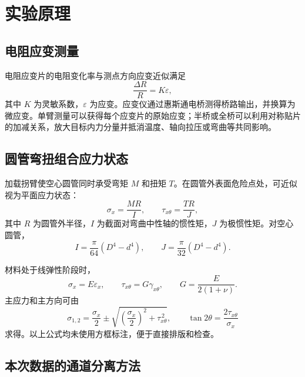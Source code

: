 \documentclass[UTF8,a4paper,10pt]{ctexart}
\begin{document}
\section{实验原理}

\subsection{电阻应变测量}

电阻应变片的电阻变化率与测点方向应变近似满足
\begin{equation}
    \frac{\Delta R}{R}=K\varepsilon ,
\end{equation}
其中 $K$ 为灵敏系数，$\varepsilon$ 为应变。应变仪通过惠斯通电桥测得桥路输出，并换算为微应变。单臂测量可以获得每个应变片的原始应变；半桥或全桥可以利用对称贴片的加减关系，放大目标内力分量并抵消温度、轴向拉压或弯曲等共同影响。

\subsection{圆管弯扭组合应力状态}

加载拐臂使空心圆管同时承受弯矩 $M$ 和扭矩 $T$。在圆管外表面危险点处，可近似视为平面应力状态：
\begin{equation}
    \sigma_x=\frac{MR}{I}, \qquad
    \tau_{x\theta}=\frac{TR}{J},
\end{equation}
其中 $R$ 为圆管外半径，$I$ 为截面对弯曲中性轴的惯性矩，$J$ 为极惯性矩。对空心圆管，
\begin{equation}
    I=\frac{\pi}{64}\left(D^4-d^4\right), \qquad
    J=\frac{\pi}{32}\left(D^4-d^4\right).
\end{equation}

材料处于线弹性阶段时，
\begin{equation}
    \sigma_x=E\varepsilon_x,\qquad
    \tau_{x\theta}=G\gamma_{x\theta},\qquad
    G=\frac{E}{2(1+\nu)} .
\end{equation}
主应力和主方向可由
\begin{equation}
    \sigma_{1,2}=\frac{\sigma_x}{2}\pm
    \sqrt{\left(\frac{\sigma_x}{2}\right)^2+\tau_{x\theta}^{\,2}},
    \qquad
    \tan 2\theta=\frac{2\tau_{x\theta}}{\sigma_x}
\end{equation}
求得。以上公式均未使用方框标注，便于直接排版和检查。

\subsection{本次数据的通道分离方法}
\end{document}
